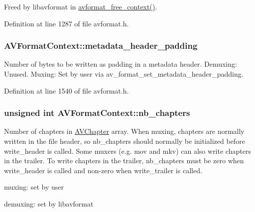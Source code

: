 Freed by libavformat in \hyperlink{group__lavf__core_gac2990b13b68e831a408fce8e1d0d6445}{avformat\+\_\+free\+\_\+context()}. 

Definition at line 1287 of file avformat.\+h.

\subsubsection[{\texorpdfstring{metadata\+\_\+header\+\_\+padding}{metadata_header_padding}}]{ A\+V\+Format\+Context\+::metadata\+\_\+header\+\_\+padding}\hypertarget{struct_a_v_format_context_a6fc5a51cf62b6e8ad379c1ac57d4a0c4}{}\label{struct_a_v_format_context_a6fc5a51cf62b6e8ad379c1ac57d4a0c4}
Number of bytes to be written as padding in a metadata header. Demuxing\+: Unused. Muxing\+: Set by user via av\+\_\+format\+\_\+set\+\_\+metadata\+\_\+header\+\_\+padding. 

Definition at line 1540 of file avformat.\+h.

\subsubsection[{\texorpdfstring{nb\+\_\+chapters}{nb_chapters}}]{\setlength{\rightskip}{0pt plus 5cm}unsigned {\bf int} A\+V\+Format\+Context\+::nb\+\_\+chapters}\hypertarget{struct_a_v_format_context_a6f60043baf4abd0d201ccefc27bb4306}{}\label{struct_a_v_format_context_a6f60043baf4abd0d201ccefc27bb4306}
Number of chapters in \hyperlink{struct_a_v_chapter}{A\+V\+Chapter} array. When muxing, chapters are normally written in the file header, so nb\+\_\+chapters should normally be initialized before write\+\_\+header is called. Some muxers (e.\+g. mov and mkv) can also write chapters in the trailer. To write chapters in the trailer, nb\+\_\+chapters must be zero when write\+\_\+header is called and non-\/zero when write\+\_\+trailer is called.
\begin{DoxyItemize}
\item muxing\+: set by user
\item demuxing\+: set by libavformat 
\end{DoxyItemize}

